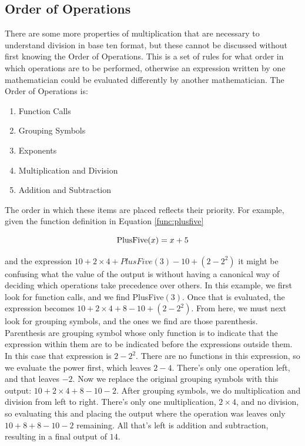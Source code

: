 \subsection{Order of Operations}
There are some more properties of multiplication that are necessary to understand division in base ten format, but these cannot be discussed without first knowing the Order of Operations. This is a set of rules for what order in which operations are to be performed, otherwise an expression written by one mathematician could be evaluated differently by another mathematician. The Order of Operations is:
\begin{center}
\begin{enumerate}
	\label{enum:OrderOps}
	\item{Function Calls}
	\item{Grouping Symbols}
	\item{Exponents}
	\item{Multiplication and Division}
	\item{Addition and Subtraction}
\end{enumerate}
\end{center}
The order in which these items are placed reflects their priority. For example, given the function definition in Equation \ref{func:plusfive}

\begin{equation}\label{func:plusfive}
\textnormal{PlusFive}(x)=x+5
\end{equation}

and the expression $10 + 2 \times 4 + PlusFive(3)-10+(2-2^2)$ it might be confusing what the value of the output is without having a canonical way of deciding which operations take precedence over others. In this example, we first look for function calls, and we find PlusFive$(3)$. Once that is evaluated, the expression becomes $10+2\times 4+ 8 -10+(2-2^2)$. From here, we must next look for grouping symbols, and the ones we find are those parenthesis. Parenthesis are grouping symbol whose only function is to indicate that the expression within them are to be indicated before the expressions outside them. In this case that expression is $2-2^2$. There are no functions in this expression, so we evaluate the power first, which leaves $2-4$. There's only one operation left, and that leaves $-2$. Now we replace the original grouping symbols with this output: $10+2\times 4+8-10-2$. After grouping symbols, we do multiplication and division from left to right. There's only one multiplication, $2\times 4$, and no division, so evaluating this and placing the output where the operation was leaves only $10+8+8-10-2$ remaining. All that's left is addition and subtraction, resulting in a final output of $14$.

